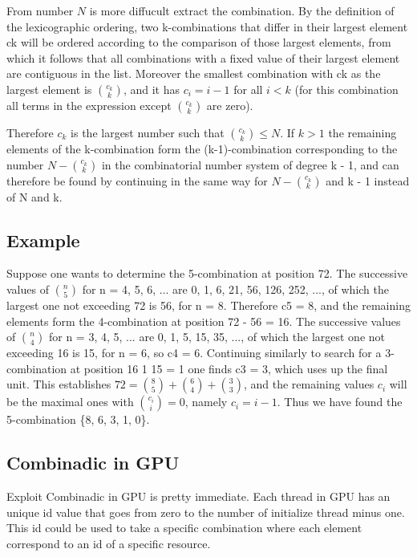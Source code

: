 From number $N$ is more diffucult extract the combination. By the definition of the lexicographic ordering, two k-combinations that 
differ in their largest element ck will be ordered according to the comparison of those largest elements, from which it follows that all
combinations with a fixed value of their largest element are contiguous in the list. Moreover the smallest combination with ck as
the largest element is $\binom {c_{k}}{k}$, and it has $c_i = i - 1$ for all $i < k$ (for this combination all terms 
in the expression except $\binom {c_{k}}{k}$ are zero). 

Therefore $c_k$ is the largest number such that $\binom {c_{k}}{k} \leq N$. 
If $k > 1$ the remaining elements of the k-combination form the (k-1)-combination corresponding to the number
$N - \binom {c_{k}}{k}$ in the combinatorial number system of degree k - 1, and can therefore be found 
by continuing in the same way for $N - \binom {c_{k}}{k}$ and k - 1 instead of N and k.

\subsection{Example}

Suppose one wants to determine the 5-combination at position 72.
The successive values of $\binom {n}{5}$ for n = 4, 5, 6, ... are 0, 1, 6, 21, 56, 126, 252, ..., of which the largest 
one not exceeding 72 is 56, for n = 8. Therefore c5 = 8, and the remaining elements form the 4-combination at position 
72 - 56 = 16. The successive values of $\binom {n}{4}$ for n = 3, 4, 5, ... are 0, 1, 5, 15, 35, ..., of which the largest
one not exceeding 16 is 15, for n = 6, so c4 = 6. Continuing similarly to search for a 3-combination at position 16 1 15 = 1
one finds c3 = 3, which uses up the final unit.
This establishes $72=\binom{8}{5}+\binom{6}{4}+\binom {3}{3}$, and the remaining values $c_i$ will be the maximal ones with
$\binom{c_i}{i}=0$, namely $c_i = i - 1$. Thus we have found the 5-combination \{8, 6, 3, 1, 0\}.

\subsection{Combinadic in GPU}

Exploit Combinadic in GPU is pretty immediate. Each thread in GPU has an unique id value that goes from zero to the number of initialize thread minus one. 
This id could be used to take a specific combination where each element correspond to an id of a specific resource. 


